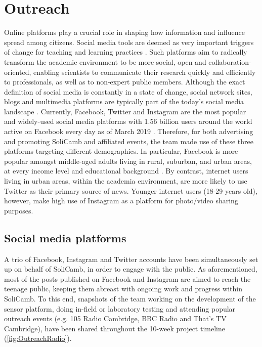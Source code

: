   \section{Outreach}
    Online platforms play a crucial role in shaping how information and influence spread among citizens. Social media tools are deemed as very important triggers of change for teaching and learning practices \cite{manca2016facebook}. Such platforms aim to radically transform the academic environment to be more social, open and collaboration-oriented, enabling scientists to communicate their research quickly and efficiently to professionals, as well as to non-expert public members. Although the exact definition of social media is constantly in a state of change, social network sites, blogs and multimedia platforms are typically part of the today's social media landscape \cite{tess2013role}. Currently, Facebook, Twitter and Instagram are the most popular and widely-used social media platforms with 1.56 billion users around the world active on Facebook every day as of March 2019 \cite{investopedia}. Therefore, for both advertising and promoting SoliCamb and affiliated events, the team made use of these three platforms targeting different demographics. In particular, Facebook is more popular amongst middle-aged adults living in rural, suburban, and urban areas, at every income level and educational background \cite{investopedia}. By contrast, internet users living in urban areas, within the academia environment, are more likely to use Twitter as their primary source of news. Younger internet users (18-29 years old), however, make high use of Instagram as a platform for photo/video sharing purposes.
     
        
        \subsection{Social media platforms}\label{Social media}
       A trio of Facebook, Instagram and Twitter accounts have been simultaneously set up on behalf of SoliCamb, in order to engage with the public. As aforementioned, most of the posts published on Facebook and Instagram are aimed to reach the teenage public, keeping them abreast with ongoing work and progress within SoliCamb. To this end, snapshots of the team working on the development of the sensor platform, doing in-field or laboratory testing and attending  popular outreach events (e.g. 105 Radio Cambridge, BBC Radio and That's TV Cambridge), have been shared throughout the 10-week project timeline (\cref {fig:OutreachRadio}). 
       

